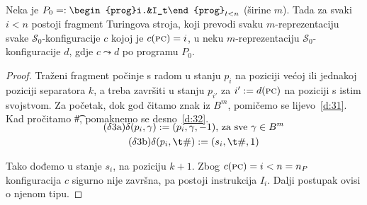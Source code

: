 \begin{lema}[{name=[{izvršavanje RAM-instrukcija na Turingovu stroju}]}]\label{lm:gadgets}
    Neka je $P_0=:\begin{prog}i.&I_t\end{prog}_{t<n}$ (širine $m$). Tada za svaki $i<n$ postoji fragment Turingova stroja, koji prevodi svaku $m$-reprezentaciju svake $\mathcal S_0$-konfiguracije $c$ kojoj je $c(\textsc{pc})=i$, u neku $m$-reprezentaciju $\mathcal S_0$-konfiguracije $d$, gdje $c\leadsto d$ po programu $P_0$.
\end{lema}
\begin{proof}
Traženi fragment počinje s radom u stanju $p_i$ na poziciji većoj ili jednakoj poziciji separatora $k$, a treba završiti u stanju $p_{i'}$ za $i':=d(\textsc{pc})$ na poziciji s istim svojstvom. Za početak, dok god čitamo znak iz $B^m$, pomičemo se lijevo~\eqref{d:31}. Kad pročitamo \t\#, pomaknemo se desno~\eqref{d:32}. 
\begin{gather*}
	\SwapAboveDisplaySkip
\label{d:31}\tag{$\delta$3a}
    \delta(p_i,\gamma):=(p_i,\gamma,-1)\text{, za sve }\gamma\in B^m\\
\label{d:32}\tag{$\delta$3b}
    \delta(p_i,\t\#):=(s_i,\t\#,1)
\end{gather*}

Tako dođemo u stanje $s_i$, na poziciju $k+1$. Zbog $c(\textsc{pc})=i<n=n_P$ konfiguracija $c$ sigurno nije završna, pa postoji instrukcija $I_i$. Dalji postupak ovisi o njenom tipu.


\end{proof}
